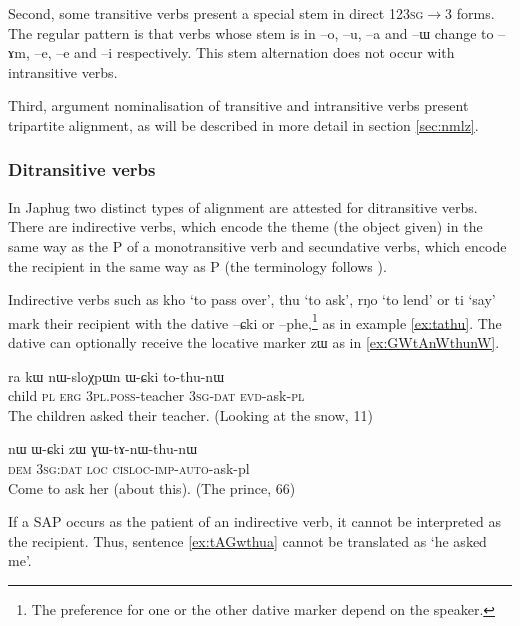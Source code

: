\documentclass[oldfontcommands,oneside,a4paper,11pt]{article}
\newcommand{\ipa}[1]{{\phon #1}} %
\begin{document}
Second,    some transitive verbs present a special stem in direct \textsc{123sg}$\rightarrow$3 forms. The regular pattern is that verbs whose stem is in --\ipa{o}, --\ipa{u}, --\ipa{a} and --\ipa{ɯ} change to --\ipa{ɤm}, --\ipa{e}, --\ipa{e} and --\ipa{i} respectively. This stem alternation does not occur with intransitive verbs.

Third, argument nominalisation of transitive   and intransitive  verbs present tripartite alignment, as will be described in more detail in section  \ref{sec:nmlz}.

\subsubsection{Ditransitive verbs} \label{sec:bitr}
 In Japhug two distinct types of alignment are attested for ditransitive verbs. There are indirective verbs, which encode the theme (the object given) in the same way as the P of a monotransitive verb and secundative verbs, which encode the recipient in the same way as P (the terminology follows \citealt{malchukov10ditransitive}).

Indirective verbs such as \ipa{kho} `to pass over', \ipa{thu} `to ask', \ipa{rŋo} `to lend' or \ipa{ti} `say' mark their recipient with the dative \ipa{--ɕki} or \ipa{--phe},\footnote{The preference for one or the other dative marker depend on the speaker.} as in example \ref{ex:tathu}. The dative can optionally receive the locative marker \ipa{zɯ} as in \ref{ex:GWtAnWthunW}.
 \begin{exe}
   \ex   \label{ex:tathu}
 \gll \ipa{tɤpɤtso}  	\ipa{ra}  	\ipa{kɯ}  	\ipa{nɯ-sloχpɯn}  	\ipa{ɯ-ɕki}  	\ipa{to-thu-nɯ}  \\
child \textsc{pl} \textsc{erg} \textsc{3pl.poss}-teacher \textsc{3sg-dat} \textsc{evd}-ask-\textsc{pl} \\
\glt The children asked their teacher. (Looking at the snow, 11)
   \end{exe}  

 \begin{exe}
   \ex   \label{ex:GWtAnWthunW}
 \gll
\ipa{nɯ}  	\ipa{ɯ-ɕki}  	\ipa{zɯ}  	\ipa{ɣɯ-tɤ-nɯ-thu-nɯ}  \\
\textsc{dem } \textsc{3sg:dat} \textsc{loc} \textsc{cisloc-imp-auto}-ask-pl \\
\glt Come to ask her (about this). (The prince, 66)
   \end{exe}  

If a  SAP occurs as the patient of an indirective verb, it cannot be interpreted as the recipient. Thus, sentence \ref{ex:tAGwthua} cannot be translated as `he asked me'.
\end{document}

